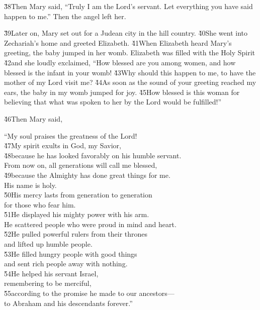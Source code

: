 \v{38}Then Mary said, ``Truly I am the Lord's servant. Let everything you have said happen to me.'' Then the angel left her.

\v{39}Later on, Mary set out for a Judean city in the hill country. \v{40}She went into Zechariah's home and greeted Elizabeth. \v{41}When Elizabeth heard Mary's greeting, the baby jumped in her womb. Elizabeth was filled with the Holy Spirit \v{42}and she loudly exclaimed, ``How blessed are you among women, and how blessed is the infant in your womb! \v{43}Why should this happen to me, to have the mother of my Lord visit me? \v{44}As soon as the sound of your greeting reached my ears, the baby in my womb jumped for joy. \v{45}How blessed is this woman for believing that what was spoken to her by the Lord would be fulfilled!''

\v{46}Then Mary said,

\begin{poetry}
\poeml ``My soul praises the greatness of the Lord! \\
\poeml \v{47}My spirit exults in God, my Savior, \\
\poeml \v{48}because he has looked favorably on his humble servant. \\
\poeml From now on, all generations will call me blessed, \\
\poeml \v{49}because the Almighty has done great things for me. \\
\poemlll       His name is holy. \\
\poeml \v{50}His mercy lasts from generation to generation \\
\poemll    for those who fear him. \\
\poeml \v{51}He displayed his mighty power with his arm. \\
\poemll    He scattered people who were proud in mind and heart. \\
\poeml \v{52}He pulled powerful rulers from their thrones \\
\poemll    and lifted up humble people. \\
\poeml \v{53}He filled hungry people with good things \\
\poemll    and sent rich people away with nothing. \\
\poeml \v{54}He helped his servant Israel, \\
\poemll    remembering to be merciful, \\
\poeml \v{55}according to the promise he made to our ancestors--- \\
\poemll    to Abraham and his descendants forever.''
\end{poetry}

